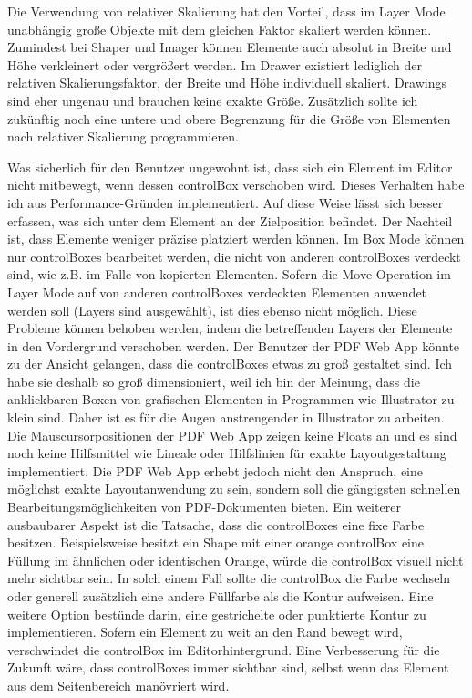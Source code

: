 \par
Die Verwendung von relativer Skalierung hat den Vorteil, dass im Layer Mode unabhängig große Objekte mit dem gleichen Faktor skaliert werden können. Zumindest bei Shaper und Imager können Elemente auch absolut in Breite und Höhe verkleinert oder vergrößert werden. Im Drawer existiert lediglich der relativen Skalierungsfaktor, der Breite und Höhe individuell skaliert. Drawings sind eher ungenau und brauchen keine exakte Größe. Zusätzlich sollte ich zukünftig noch eine untere und obere Begrenzung für die Größe von Elementen nach relativer Skalierung programmieren. 
\par
Was sicherlich für den Benutzer ungewohnt ist, dass sich ein Element im Editor nicht mitbewegt, wenn dessen controlBox verschoben wird. Dieses Verhalten habe ich aus Performance-Gründen implementiert. Auf diese Weise lässt sich besser erfassen, was sich unter dem Element an der Zielposition befindet. Der Nachteil ist, dass Elemente weniger präzise platziert werden können. Im Box Mode können nur controlBoxes bearbeitet werden, die nicht von anderen controlBoxes verdeckt sind, wie z.B. im Falle von kopierten Elementen. Sofern die Move-Operation im Layer Mode auf von anderen controlBoxes verdeckten Elementen anwendet werden soll (Layers sind ausgewählt), ist dies ebenso nicht möglich. Diese Probleme können behoben werden, indem die betreffenden Layers der Elemente in den Vordergrund verschoben werden. Der Benutzer der PDF Web App könnte zu der Ansicht gelangen, dass die controlBoxes etwas zu groß gestaltet sind. Ich habe sie deshalb so groß dimensioniert, weil ich bin der Meinung, dass die anklickbaren Boxen von grafischen Elementen in Programmen wie Illustrator zu klein sind. Daher ist es für die Augen anstrengender in Illustrator zu arbeiten. Die Mauscursorpositionen der PDF Web App zeigen keine Floats an und es sind noch keine Hilfsmittel wie Lineale oder Hilfslinien für exakte Layoutgestaltung implementiert. Die PDF Web App erhebt jedoch nicht den Anspruch, eine möglichst exakte Layoutanwendung zu sein, sondern soll die gängigsten schnellen Bearbeitungsmöglichkeiten von PDF-Dokumenten bieten. Ein weiterer ausbaubarer Aspekt ist die Tatsache, dass die controlBoxes eine fixe Farbe besitzen. Beispielsweise besitzt ein Shape mit einer orange controlBox eine Füllung im ähnlichen oder identischen Orange, würde die controlBox visuell nicht mehr sichtbar sein. In solch einem Fall sollte die controlBox die Farbe wechseln oder generell zusätzlich eine andere Füllfarbe als die Kontur aufweisen. Eine weitere Option bestünde darin, eine gestrichelte oder punktierte Kontur zu implementieren. Sofern ein Element zu weit an den Rand bewegt wird, verschwindet die controlBox im Editorhintergrund. Eine Verbesserung für die Zukunft wäre, dass controlBoxes immer sichtbar sind, selbst wenn das Element aus dem Seitenbereich manövriert wird.
